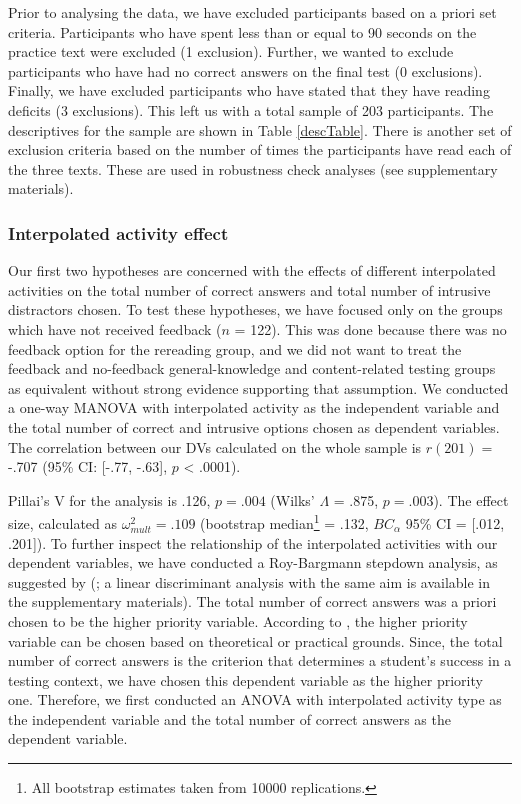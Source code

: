 \documentclass[11pt,]{article}
\let\rmarkdownfootnote\footnote%
\def\footnote{\protect\rmarkdownfootnote}
\begin{document}
Prior to analysing the data, we have excluded participants based on a
priori set criteria. Participants who have spent less than or equal to
90 seconds on the practice text were excluded (1 exclusion). Further, we
wanted to exclude participants who have had no correct answers on the
final test (0 exclusions). Finally, we have excluded participants who
have stated that they have reading deficits (3 exclusions). This left us
with a total sample of 203 participants. The descriptives for the sample
are shown in Table \ref{descTable}. There is another set of exclusion
criteria based on the number of times the participants have read each of
the three texts. These are used in robustness check analyses (see
supplementary materials).

\hypertarget{interpolated-activity-effect}{%
\subsubsection{Interpolated activity
effect}\label{interpolated-activity-effect}}

Our first two hypotheses are concerned with the effects of different
interpolated activities on the total number of correct answers and total
number of intrusive distractors chosen. To test these hypotheses, we
have focused only on the groups which have not received feedback (\(n\)
= 122). This was done because there was no feedback option for the
rereading group, and we did not want to treat the feedback and
no-feedback general-knowledge and content-related testing groups as
equivalent without strong evidence supporting that assumption. We
conducted a one-way MANOVA with interpolated activity as the independent
variable and the total number of correct and intrusive options chosen as
dependent variables. The correlation between our DVs calculated on the
whole sample is \(r(201) =\) -.707 (95\% CI: {[}-.77, -.63{]}, \(p\)
\textless{} .0001).

Pillai's V for the analysis is .126, \(p = .004\) (Wilks' \(\Lambda\) =
.875, \(p = .003\)). The effect size, calculated as
\(\omega^2_{mult} = .109\) (bootstrap
median\footnote{All bootstrap estimates taken from 10000 replications.}
= .132, \(BC_\alpha\) 95\% CI = {[}.012, .201{]}). To further inspect
the relationship of the interpolated activities with our dependent
variables, we have conducted a Roy-Bargmann stepdown analysis, as
suggested by \citeauthor{tabachnickUsingMultivariateStatistics2012}
(\citeyear{tabachnickUsingMultivariateStatistics2012}; a linear
discriminant analysis with the same aim is available in the
supplementary materials). The total number of correct answers was a
priori chosen to be the higher priority variable. According to
\citet{tabachnickUsingMultivariateStatistics2012}, the higher priority
variable can be chosen based on theoretical or practical grounds. Since,
the total number of correct answers is the criterion that determines a
student's success in a testing context, we have chosen this dependent
variable as the higher priority one. Therefore, we first conducted an
ANOVA with interpolated activity type as the independent variable and
the total number of correct answers as the dependent variable.
\end{document}
